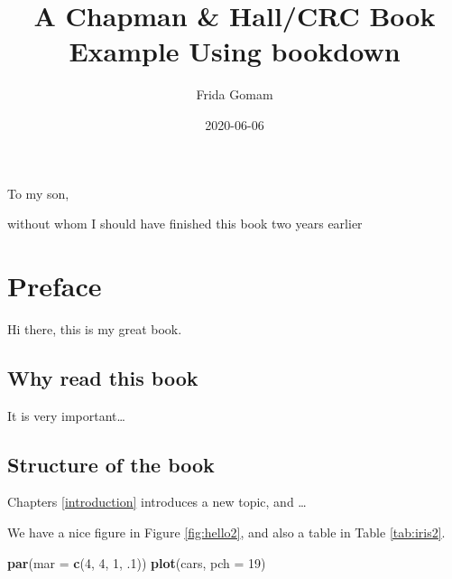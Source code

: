 \documentclass[
]{krantz}
\title{A Chapman \& Hall/CRC Book Example Using bookdown}
\author{Frida Gomam}
\date{2020-06-06}
\makeatletter
\newenvironment{Shaded}{\begin{snugshade}}{\end{snugshade}}
\newcommand{\DataTypeTok}[1]{\textcolor[rgb]{0.27,0.27,0.27}{#1}}
\newcommand{\DecValTok}[1]{\textcolor[rgb]{0.06,0.06,0.06}{#1}}
\newcommand{\FloatTok}[1]{\textcolor[rgb]{0.06,0.06,0.06}{#1}}
\newcommand{\KeywordTok}[1]{\textcolor[rgb]{0.27,0.27,0.27}{\textbf{#1}}}
\newcommand{\NormalTok}[1]{#1}
\newenvironment{kframe}{%
\medskip{}
\setlength{\fboxsep}{.8em}
 \def\at@end@of@kframe{}%
 \ifinner\ifhmode%
  \def\at@end@of@kframe{\end{minipage}}%
  \begin{minipage}{\columnwidth}%
 \fi\fi%
 \def\FrameCommand##1{\hskip\@totalleftmargin \hskip-\fboxsep
 \colorbox{shadecolor}{##1}\hskip-\fboxsep
     \hskip-\linewidth \hskip-\@totalleftmargin \hskip\columnwidth}%
 \MakeFramed {\advance\hsize-\width
   \@totalleftmargin\z@ \linewidth\hsize
   \@setminipage}}%
 {\par\unskip\endMakeFramed%
 \at@end@of@kframe}
\renewenvironment{Shaded}{\begin{kframe}}{\end{kframe}}
\makeatother
\begin{document}
\maketitle


\thispagestyle{empty}

\begin{center}
To my son,

without whom I should have finished this book two years earlier
\end{center}

\setlength{\abovedisplayskip}{-5pt}
\setlength{\abovedisplayshortskip}{-5pt}

{
\hypersetup{linkcolor=}
\setcounter{tocdepth}{2}
\tableofcontents
}
\listoftables
\listoffigures
\hypertarget{preface}{%
\chapter*{Preface}\label{preface}}


Hi there, this is my great book.

\hypertarget{why-read-this-book}{%
\section*{Why read this book}\label{why-read-this-book}}


It is very important\ldots{}

\hypertarget{structure-of-the-book}{%
\section*{Structure of the book}\label{structure-of-the-book}}


Chapters \ref{introduction} introduces a new topic, and \ldots{}

We have a nice figure in Figure \ref{fig:hello2}, and also a table in Table \ref{tab:iris2}.

\begin{Shaded}
\begin{Highlighting}[]
\KeywordTok{par}\NormalTok{(}\DataTypeTok{mar =} \KeywordTok{c}\NormalTok{(}\DecValTok{4}\NormalTok{, }\DecValTok{4}\NormalTok{, }\DecValTok{1}\NormalTok{, }\FloatTok{.1}\NormalTok{))}
\KeywordTok{plot}\NormalTok{(cars, }\DataTypeTok{pch =} \DecValTok{19}\NormalTok{)}
\end{Highlighting}
\end{Shaded}
\end{document}
